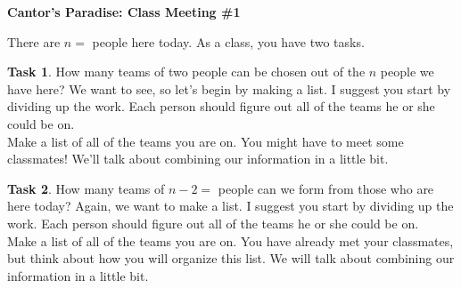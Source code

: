 \documentclass[12pt]{amsart}
\theoremstyle{definition}
\newtheorem{task}{Task}
\begin{document}
\begin{center}
\textbf{\Huge
Cantor's Paradise: Class Meeting \#1
}
\end{center}


\vspace{.5in}

There are $n = $\underline{\hspace{2in}} people here today.
As a class, you have two tasks.

\begin{task}
How many teams of two people can be chosen out of the $n$ people we have here? We want to see, so let's begin by making a list. I suggest you start by dividing up the work. Each person should figure out all of the teams he or she could be on.\\

Make a list of all of the teams you are on. You might have to meet some classmates! We'll talk about combining our information in a little bit.
\end{task}


\clearpage

\begin{task}
How many teams of $n - 2 = $ \underline{\hspace{2in}} people can we form from those who are here today? Again, we want to make a list. I suggest you start by dividing up the work. Each person should figure out all of the teams he or she could be on.\\

Make a list of all of the teams you are on. You have already met your classmates, but think about how you will organize this list. We will talk about combining our information in a little bit.
\end{task}

\clearpage
\end{document}
